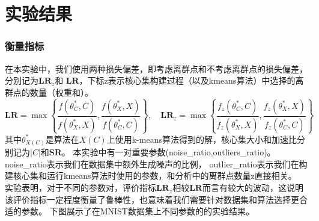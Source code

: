 \documentclass[aspectratio=169]{ctexbeamer}
\begin{document}
\section{实验结果}
\begin{frame}
  \frametitle{衡量指标}
  在本实验中，我们使用两种损失偏差，即考虑离群点和不考虑离群点的损失偏差，分别记为$\mathbf{LR}_z$和
$\mathbf{LR}$，下标z表示核心集构建过程（以及kmeans算法）中选择的离群点的数量（权重和）。
\begin{equation*}
    \mathbf{LR} = \max\left\{\frac{f(\theta^*_C,C)}{f(\theta^*_X,X)},\frac{f(\theta^*_X,X)}{f(\theta^*_C,C)}\right\},\quad
    \mathbf{LR}_z = \max\left\{\frac{f_z(\theta^*_C,C)}{f_z(\theta^*_X,X)},\frac{f_z(\theta^*_X,X)}{f_z(\theta^*_C,C)}\right\}
\end{equation*}
其中$\theta^*_{X(C)}$是算法在$X(C)$上使用k-means算法得到的解，核心集大小和加速比分别记为$|C|$和$\mathbf{SR}$。
本实验中有一对重要参数(noise\_ratio,outliers\_ratio)。noise\_ratio表示我们在数据集中额外生成噪声的比例，
outlier\_ratio表示我们在构建核心集和运行kmeans算法时使用的参数，和分析中的离群点数量z直接相关。
实验表明，对于不同的参数对，评价指标$\mathbf{LR}_z$相较$\mathbf{LR}$而言有较大的波动，这说明该评价指标一定程度衡量了鲁棒性，也意味着我们需要针对数据集和算法选择更合适的参数。
下图展示了在MNIST数据集上不同参数的的实验结果。
\end{frame}
\end{document}
